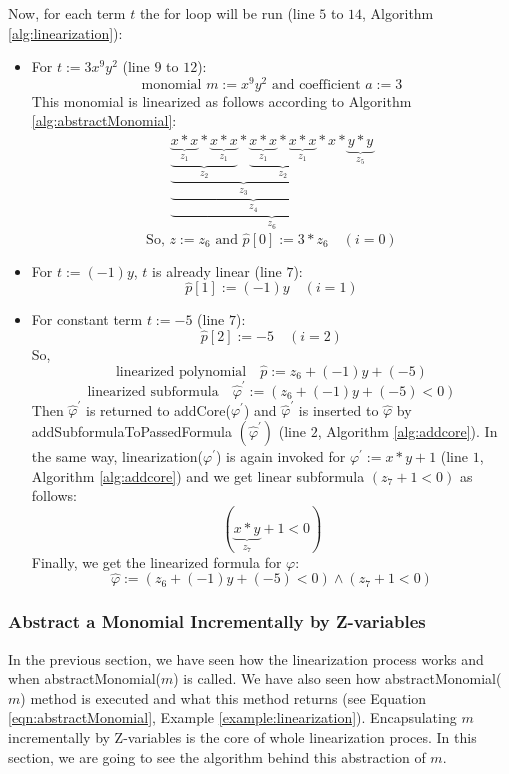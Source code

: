 \begin{example}
\noindent Now, for each term $t$ the for loop will be run (line $5$ to $14$, Algorithm \ref{alg:linearization}):
\begin{itemize}
	\item For $t := 3x^9y^2$ (line $9$ to $12$):
	$$\text{monomial }m := x^9y^2 \text{ and coefficient } a := 3$$
	This monomial is linearized as follows according to Algorithm \ref{alg:abstractMonomial}:
	\begin{align}
	    \underbrace{ \underbrace{ \underbrace{ \underbrace{ \underbrace{ x \ast x }\limits_{z_{1}} \ast \underbrace{ x \ast x }\limits_{z_{1}}}\limits_{z_{2}} \ast \underbrace{ \underbrace{ x \ast x }\limits_{z_{1}} \ast \underbrace{ x \ast x }\limits_{z_{1}}}\limits_{z_{2}}}\limits_{z_{3}} \ast x}\limits_{z_{4}} \ast \underbrace{ y \ast y }\limits_{z_{5}}}\limits_{z_{6}} \label{eqn:abstractMonomial}
	\end{align}
	$$\text{So, }z := z_{6}\text{ and } \hat{p}[0] := 3 \ast z_{6} \quad (i = 0)$$
    \item For $t := (-1)y$, $t$ is already linear (line $7$):
    $$\hat{p}[1] := (-1)y \quad (i = 1)$$
    \item For constant term $t := -5$ (line $7$):
    $$\hat{p}[2] := -5 \quad (i = 2)$$
So,
$$\text{linearized polynomial} \quad \hat{p} := z_{6} + (-1)y + (-5)$$
$$\text{linearized subformula} \quad \hat{\varphi}^\prime := ( z_{6} + (-1)y + (-5) < 0 )$$
Then $\hat{\varphi}^\prime$ is returned to addCore($\varphi^\prime$) and $\hat{\varphi}^\prime$ is inserted to $\hat{\varphi}$ by addSubformulaToPassedFormula $( \hat{\varphi}^\prime )$ (line $2$, Algorithm \ref{alg:addcore}).
In the same way, linearization($\varphi^\prime$) is again invoked for $\varphi^\prime:= x \ast y + 1$ (line $1$, Algorithm \ref{alg:addcore}) and  we get linear subformula $( z_{7} + 1 < 0 )$ as follows:
$$(\underbrace{ x \ast y }\limits_{z_{7}} + 1 < 0)$$
Finally, we get the linearized formula for $\varphi$:
$$\hat{\varphi} := ( z_{6} + (-1)y + (-5) < 0 ) \wedge ( z_{7} + 1 < 0 )$$
\end{itemize}
\end{example}
\subsubsection{Abstract a Monomial Incrementally by Z-variables}
\label{subsubsec:Abstract_A_Monomial_IncrementallyBy_Z-variables}
In the previous section, we have seen how the linearization process works and when abstractMonomial($m$) is called.
We have also seen how abstractMonomial($m$) method is executed and what this method returns (see Equation \ref{eqn:abstractMonomial}, Example \ref{example:linearization}). 
Encapsulating $m$ incrementally by Z-variables is the core of whole linearization proces.
In this section, we are going to see the algorithm behind this abstraction of $m$.\newline

